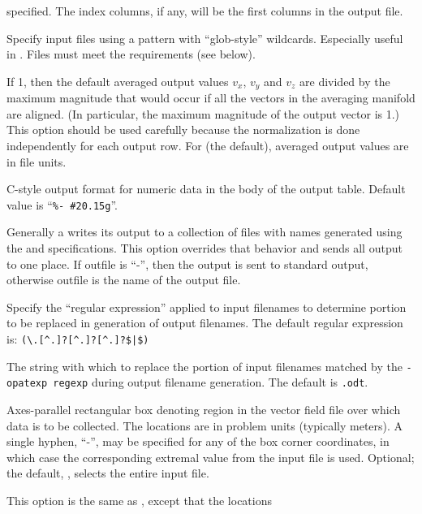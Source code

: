 \begin{description}
  specified.  The index columns, if any, will be the first columns in
  the output file.
\item[\optkey{-ipat pattern}]
  Specify input files using a pattern with ``glob-style'' wildcards.
  Especially useful in \DOS.  Files must meet the 
  requirements (see below).
\item[\optkey{-normalize \boa 0\pipe 1\bca}]
  If 1, then the default averaged output values $v_x$, $v_y$ and $v_z$
  are divided by the maximum magnitude that would occur if all the
  vectors in the averaging manifold are aligned.  (In particular, the
  maximum magnitude of the output vector is 1.)  This option should
  be used carefully because the normalization is done independently for
  each output row.  For 
  (the default), averaged output values are in file units.
\item[\optkey{-numfmt fmt}]
  C-style output format for numeric data in the body of the output
  table.  Default value is ``\verb+%- #20.15g+''.
\item[\optkey{-onefile outfile}]
  Generally a  writes its output to a collection of files
  with names generated using the  and 
  specifications.  This option overrides that behavior and sends all
  output to one place.  If outfile is ``-'', then the output is sent
  to standard output, otherwise outfile is the name of the output file.
\item[\optkey{-opatexp regexp}]
  Specify the ``regular expression'' applied to input filenames to
  determine portion to be replaced in generation of output filenames.
  The default regular expression is: {\verb!(\.[^.]?[^.]?[^.]?$|$)!}
\item[\optkey{-opatsub sub}]
  The string with which to replace the portion of input filenames
  matched by the {\tt -opatexp regexp} during output filename
  generation.  The default is {\verb!.odt!}.
\item[\optkey{-region xmin ymin zmin xmax ymax zmax}]
  Axes-parallel rectangular box denoting region in the vector field
  file over which data is to be collected.  The locations are in
  problem units (typically meters).  A single hyphen, ``-'', may be
  specified for any of the box corner coordinates, in which case the
  corresponding extremal value from the input file is used.  Optional;
  the default, , selects the entire input file.
\item[\optkey{-rregion rxmin rymin rzmin rxmax rymax rzmax}]
  This option is the same as , except that the locations

\end{description}
